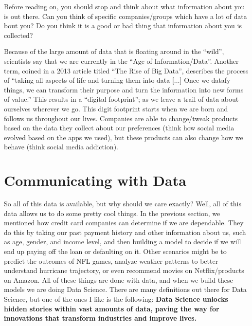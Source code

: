 \documentclass[
  letterpaper,
  DIV=11,
  numbers=noendperiod]{scrreprt}
\begin{document}
Before reading on, you should stop and think about what information
about you is out there. Can you think of specific companies/groups which
have a lot of data bout you? Do you think it is a good or bad thing that
information about you is collected?

Because of the large amount of data that is floating around in the
``wild'', scientists say that we are currently in the ``Age of
Information/Data''. Another term, coined in a 2013 article titled ``The
Rise of Big Data'', describes the process of ``taking all aspects of
life and turning them into data {[}\(\dots\){]} Once we datafy things,
we can transform their purpose and turn the information into new forms
of value.'' This results in a ``digital footprint''; as we leave a trail
of data about ourselves wherever we go. This digit footprint starts when
we are born and follows us throughout our lives. Companies are able to
change/tweak products based on the data they collect about our
preferences (think how social media evolved based on the apps we used),
but these products can also change how we behave (think social media
addiction).

\section{Communicating with Data}\label{communicating-with-data}

So all of this data is available, but why should we care exactly? Well,
all of this data allows us to do some pretty cool things. In the
previous section, we mentioned how credit card companies can determine
if we are dependable. They do this by taking our past payment history
and other information about us, such as age, gender, and income level,
and then building a model to decide if we will end up paying off the
loan or defaulting on it. Other scenarios might be to predict the
outcomes of NFL games, analyze weather patterns to better understand
hurricane trajectory, or even recommend movies on Netflix/products on
Amazon. All of these things are done with data, and when we build these
models we are doing Data Science. There are many definitions out there
for Data Science, but one of the ones I like is the following:
\textbf{Data Science unlocks hidden stories within vast amounts of data,
paving the way for innovations that transform industries and improve
lives.}
\end{document}
